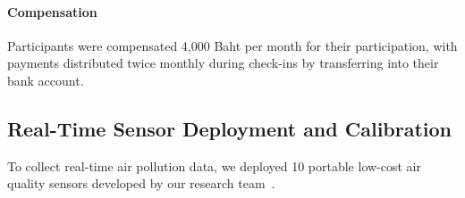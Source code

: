 


\paragraph{Compensation}
Participants were compensated 4,000 Baht per month for their participation, with payments distributed twice monthly during check-ins by transferring into their bank account.

\subsection{Real-Time Sensor Deployment and Calibration}

To collect real-time air pollution data, we deployed 10 portable low-cost air quality sensors developed by our research team~\cite{pA2025sensor}.




